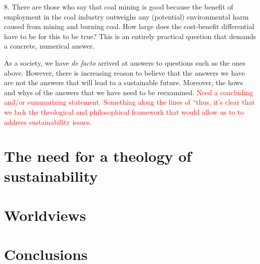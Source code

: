 \documentclass[12pt]{article}
\newcommand{\ins}[1]{\textcolor{red}{#1}}
\begin{document}
8. There are those who say that coal mining is good because the benefit of employment in the coal industry outweighs
any (potential) environmental harm caused from mining and burning coal. How large does the cost-benefit differential
have to be for this to be true? This is an entirely practical question that demands a concrete, numerical answer.


		  



As a society, we have \emph{de facto} arrived at answers to questions such as the ones above. However, 
there is increasing reason to believe that the answers we have are not the answers that will lead to a sustainable future.
Moreover, the hows and whys of the answers that we have need to be reexamined.
\ins{Need a concluding and/or summarizing statement. Something along the lines of ``thus, it's clear that we lack the theological
and philosophical framework that would allow us to to address sustainability issues.}



\section{The need for a theology of sustainability}
\label{sec:need_for_theology_of_sustainability}



\section{Worldviews}
\label{sec:worldviews}


\section{Conclusions}
\label{sec:conclusions}



\printbibliography
\end{document}
